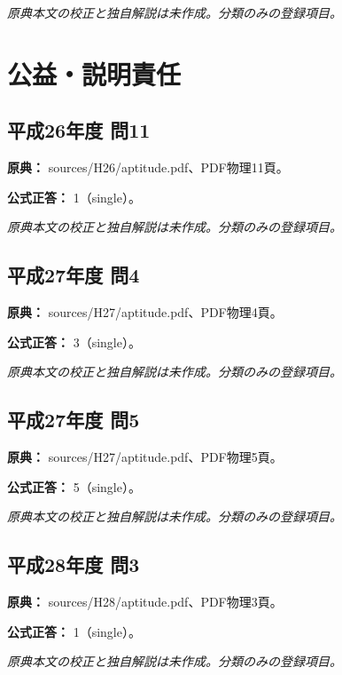 \par\textit{原典本文の校正と独自解説は未作成。分類のみの登録項目。}

\section{公益・説明責任}

\subsection{平成26年度 問11}
\label{q:h26-reg-apt-11}

\noindent\textbf{原典：} sources/H26/aptitude.pdf、PDF物理11頁。

\textbf{公式正答：} 1（single）。

\par\textit{原典本文の校正と独自解説は未作成。分類のみの登録項目。}

\subsection{平成27年度 問4}
\label{q:h27-reg-apt-04}

\noindent\textbf{原典：} sources/H27/aptitude.pdf、PDF物理4頁。

\textbf{公式正答：} 3（single）。

\par\textit{原典本文の校正と独自解説は未作成。分類のみの登録項目。}

\subsection{平成27年度 問5}
\label{q:h27-reg-apt-05}

\noindent\textbf{原典：} sources/H27/aptitude.pdf、PDF物理5頁。

\textbf{公式正答：} 5（single）。

\par\textit{原典本文の校正と独自解説は未作成。分類のみの登録項目。}

\subsection{平成28年度 問3}
\label{q:h28-reg-apt-03}

\noindent\textbf{原典：} sources/H28/aptitude.pdf、PDF物理3頁。

\textbf{公式正答：} 1（single）。

\par\textit{原典本文の校正と独自解説は未作成。分類のみの登録項目。}

